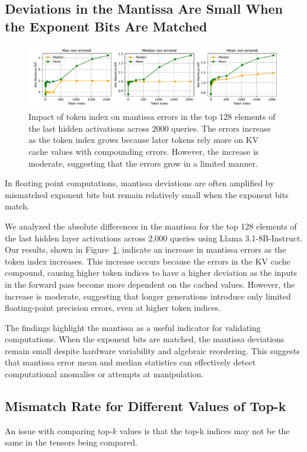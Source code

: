 \documentclass{article}
\theoremstyle{plain}
\theoremstyle{definition}
\theoremstyle{remark}
\begin{document}
\subsection{Deviations in the Mantissa Are Small When the Exponent Bits Are Matched}

\begin{figure}[ht]
  \centerline{\includegraphics[width=\linewidth]{figures/mant_error_by_token_index.pdf}}
  \caption{Impact of token index on mantissa errors in the top 128 elements of the last hidden activations across 2000 queries. The errors increase as the token index grows because later tokens rely more on KV cache values with compounding errors. However, the increase is moderate, suggesting that the errors grow in a limited manner.}
  \label{fig:error_growth_token_index}
\end{figure}

In floating point computations, mantissa deviations are often amplified by mismatched exponent bits but remain relatively small when the exponent bits match.

We analyzed the absolute differences in the mantissa for the top 128 elements of the last hidden layer activations across 2,000 queries using Llama 3.1-8B-Instruct.
Our results, shown in Figure~\ref{fig:error_growth_token_index}, indicate an increase in mantissa errors as the token index increases.
This increase occurs because the errors in the KV cache compound, causing higher token indices to have a higher deviation as the inputs in the forward pass become more dependent on the cached values.
However, the increase is moderate, suggesting that longer generations introduce only limited floating-point precision errors, even at higher token indices.

The findings highlight the mantissa as a useful indicator for validating computations.
When the exponent bits are matched, the mantissa deviations remain small despite hardware variability and algebraic reordering.
This suggests that mantissa error mean and median statistics can effectively detect computational anomalies or attempts at manipulation.

\subsection{Mismatch Rate for Different Values of Top-k}
An issue with comparing top-$k$ values is that the top-k indices may not be the same in the tensors being compared.
\end{document}
